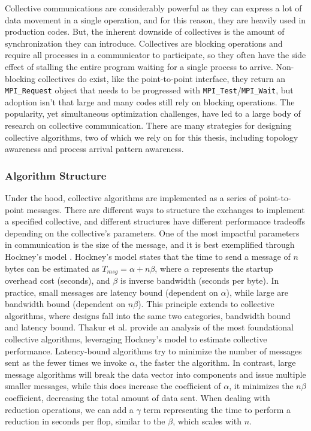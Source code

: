 Collective communications are considerably powerful as they can express a lot of data movement in a single operation, and for this reason, they are heavily used in production codes.
But, the inherent downside of collectives is the amount of synchronization they can introduce.
Collectives are blocking operations and require all processes in a communicator to participate, so they often have the side effect of stalling the entire program waiting for a single process to arrive.
Non-blocking collectives do exist, like the point-to-point interface, they return an \texttt{MPI\_Request} object that needs to be progressed with \texttt{MPI\_Test}/\texttt{MPI\_Wait}, but adoption isn't that large and many codes still rely on blocking operations.
The popularity, yet simultaneous optimization challenges, have led to a large body of research on collective communication. 
There are many strategies for designing collective algorithms, two of which we rely on for this thesis, including topology awareness and process arrival pattern awareness.

\subsubsection{Algorithm Structure}\label{sec:CH2-MPI-AlgStructure}
Under the hood, collective algorithms are implemented as a series of point-to-point messages. 
There are different ways to structure the exchanges to implement a specified collective, and different structures have different performance tradeoffs depending on the collective's parameters.
One of the most impactful parameters in communication is the size of the message, and it is best exemplified through Hockney's model \cite{Hockney1994HockenyModel}.
Hockney's model states that the time to send a message of $n$ bytes can be estimated as $T_{msg}=\alpha+n\beta$, where $\alpha$ represents the startup overhead cost (seconds), and $\beta$ is inverse bandwidth (seconds per byte).
In practice, small messages are latency bound (dependent on $\alpha$), while large are bandwidth bound (dependent on $n\beta$).
This principle extends to collective algorithms, where designs fall into the same two categories, bandwidth bound and latency bound.
Thakur et al. \cite{Thakur2005OptMPICH} provide an analysis of the most foundational collective algorithms, leveraging Hockney's model to estimate collective performance.
Latency-bound algorithms try to minimize the number of messages sent as the fewer times we invoke $\alpha$, the faster the algorithm. 
In contrast, large message algorithms will break the data vector into components and issue multiple smaller messages, while this does increase the coefficient of $\alpha$, it minimizes the $n\beta$ coefficient, decreasing the total amount of data sent.
When dealing with reduction operations, we can add a $\gamma$ term representing the time to perform a reduction in seconds per flop, similar to the $\beta$, which scales with $n$.

